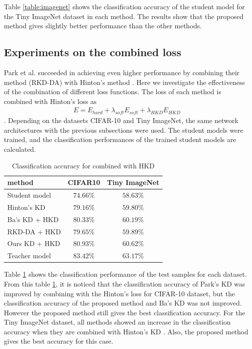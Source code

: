 \documentclass[conference]{IEEEtran}
\begin{document}
Table \ref{table:imagenet} shows the classification accuracy of the student model for the Tiny ImageNet dataset in each method.
The results show that the proposed method gives slightly better performance than the other methods.


\subsection{Experiments on the combined loss}

Park et al. \cite{Park2019} succeeded in achieving even higher performance by combining their method (RKD-DA) with Hinton's method \cite{Hinton2015}.
Here we investigate the effectiveness of the combination of different loss functions.
The loss of each method is combined with Hinton's loss as
\begin{align} \label{eq:distillation loss2}
E = E_{hard} + \lambda_{soft} E_{soft} + \lambda_{HKD} E_{HKD}
\end{align}.
Depending on the datasets CIFAR-10 and Tiny ImageNet, the same network architectures with the previous subsections were used.
The student models were trained, and the classification performances of the trained student models are calculated.

\begin{table}[ht]
\caption{Classification accuracy for combined with HKD}
\label{table:combined}
\begin{center}
\begin{tabular}{|l|c|c|}
\hline
method & CIFAR10 & Tiny ImageNet \\ \hline \hline
Student model &$74.66\%$  & $58.63\%$ \\ \hline
Hinton's KD & $79.16\%$ & $59.80\%$  \\ \hline
Ba's KD + HKD & $80.33\%$ & $60.19\%$  \\ \hline
RKD-DA + HKD &  $79.65\%$   & $59.89\%$      \\ \hline
Ours KD + HKD & $\bm{80.93}\%$ & $\bm{60.62}\%$  \\ \hline \hline
Teacher model  & $83.42\%$  & $63.17\%$  \\
\hline
\end{tabular}
\end{center}
\end{table}

Table \ref{table:combined} shows the classification performance of the test samples for each dataset.
From this table \ref{table:combined}, it is noticed that the classification accuracy of Park's KD \cite{Park2019} was improved by combining with the Hinton's loss for CIFAR-10 dataset, but the classification accuracy of the proposed method and Ba's KD \cite{Ba2014} was not improved.
However the proposed method still gives the best classification accuracy.
For the Tiny ImageNet dataset, all methods showed an increase in the classification accuracy when they are combined with Hinton's KD \cite{Hinton2015}.
Also, the proposed method gives the best accuracy for this case.
\end{document}
